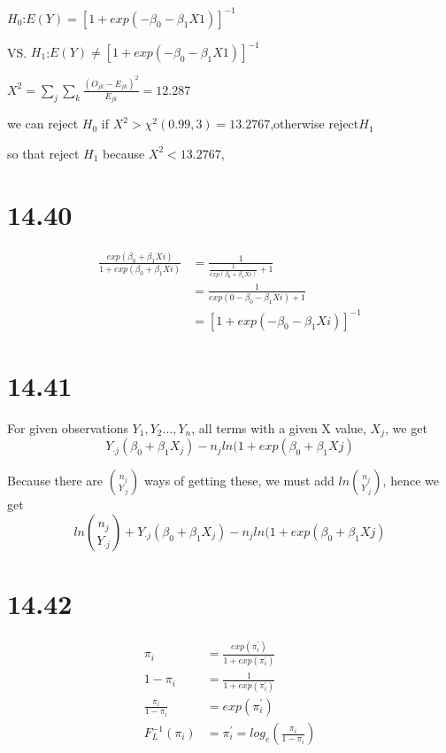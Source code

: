 \documentclass{article}\usepackage[]{graphicx}\usepackage[]{color}
\begin{document}
\begin{center}
$H_0$:$E(Y)=[1+exp(-\beta_0-\beta_1 X1)]^{-1}$

VS. $H_1$:$E(Y)  \ne [1+exp(-\beta_0-\beta_1 X1)]^{-1}$

$X^2=\sum_j \sum_k \frac{(O_{jk}-E_{jk})^2}{E_{jk}} = 12.287$

we can reject $H_0$ if $X^2 > \chi^2(0.99, 3)=13.2767$,otherwise reject$H_1$

so that reject $H_1$ because $X^2 <13.2767$, 
\end{center}



\section{14.40}

\begin{displaymath}
\begin{split}
  \frac{exp(\beta_0+\beta_1 Xi)}{1+exp(\beta_0+\beta_1 Xi)} &= \frac{1}{\frac{1}{exp(\beta_0+\beta_1 Xi)}+1} \\
    &= \frac{1}{exp(0-\beta_0-\beta_1 Xi) + 1} \\
    &= [1+exp(-\beta_0-\beta_1 Xi)]^{-1}
\end{split}
\end{displaymath}

\section{14.41}

\qquad For given observations $Y_1,Y_2...,Y_n$, all terms with a given X value, $X_j$, we get $$Y_{\cdot j}(\beta_0+\beta_1 X_j)-n_j ln(1+exp(\beta_0+\beta_1 Xj)$$

Because there are $\binom{n_j}{Y_{\cdot j}}$ ways of getting these, we must add $ ln\binom{n_j}{Y_{\cdot j}}$, hence we get $$ln \binom{n_j}{Y_{\cdot j}} + Y_{\cdot j}(\beta_0+\beta_1 X_j)-n_j ln(1+exp(\beta_0+\beta_1 Xj)$$

\section{14.42}

\begin{displaymath}
\begin{split}
  \pi_i &= \frac{exp(\pi_i^{'})}{1+exp(\pi_i^{'})} \\
  1-\pi_i &= \frac{1}{1+exp(\pi_i^{'})} \\
  \frac{\pi_i}{1-\pi_i} &= exp(\pi_i^{'}) \\
  F_L^{-1}(\pi_i) &= \pi_i^{'} =  log_e( \frac{\pi_i}{1-\pi_i})
\end{split}
\end{displaymath}
\end{document}
